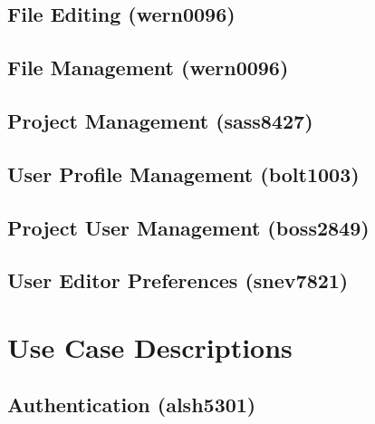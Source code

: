 \documentclass[11pt]{report}
\begin{document}
\subsection{File Editing (wern0096)}
\subsection{File Management (wern0096)}
\subsection{Project Management (sass8427)}
\subsection{User Profile Management (bolt1003)}
\subsection{Project User Management (boss2849)}
\subsection{User Editor Preferences (snev7821)}

\section{Use Case Descriptions}
\subsection{Authentication (alsh5301)}
\end{document}
